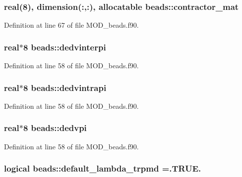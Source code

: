 \hypertarget{classbeads_a9020a7560a1b66c7a74572df622d7f3e}{
\subsubsection[{contractor\-\_\-mat}]{\setlength{\rightskip}{0pt plus 5cm}real(8), dimension(\-:,\-:), allocatable beads\-::contractor\-\_\-mat}}\label{classbeads_a9020a7560a1b66c7a74572df622d7f3e}


Definition at line 67 of file M\-O\-D\-\_\-beads.\-f90.

\hypertarget{classbeads_a407bf78d2a253686a7e1b6f37f559107}{
\subsubsection[{dedvinterpi}]{\setlength{\rightskip}{0pt plus 5cm}real$\ast$8 beads\-::dedvinterpi}}\label{classbeads_a407bf78d2a253686a7e1b6f37f559107}


Definition at line 58 of file M\-O\-D\-\_\-beads.\-f90.

\hypertarget{classbeads_ac0412d751986be2a18361d16c4f3b632}{
\subsubsection[{dedvintrapi}]{\setlength{\rightskip}{0pt plus 5cm}real$\ast$8 beads\-::dedvintrapi}}\label{classbeads_ac0412d751986be2a18361d16c4f3b632}


Definition at line 58 of file M\-O\-D\-\_\-beads.\-f90.

\hypertarget{classbeads_a9af03c4ca66930f0df7a0a7724b74be4}{
\subsubsection[{dedvpi}]{\setlength{\rightskip}{0pt plus 5cm}real$\ast$8 beads\-::dedvpi}}\label{classbeads_a9af03c4ca66930f0df7a0a7724b74be4}


Definition at line 58 of file M\-O\-D\-\_\-beads.\-f90.

\hypertarget{classbeads_ab1c00af7003e00651eff48ddce18c3a8}{
\subsubsection[{default\-\_\-lambda\-\_\-trpmd}]{\setlength{\rightskip}{0pt plus 5cm}logical beads\-::default\-\_\-lambda\-\_\-trpmd =.T\-R\-U\-E.}}\label{classbeads_ab1c00af7003e00651eff48ddce18c3a8}


